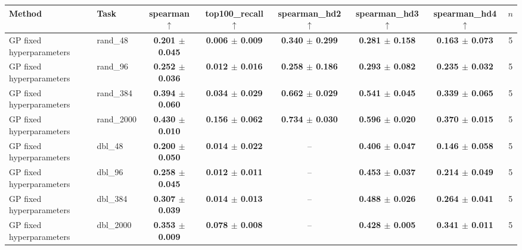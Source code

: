 \begin{tabular}{llcccccc}
\toprule
Method & Task & spearman $\uparrow$ & top100\_recall $\uparrow$ & spearman\_hd2 $\uparrow$ & spearman\_hd3 $\uparrow$ & spearman\_hd4 $\uparrow$ & $n$ \\
\midrule
GP fixed hyperparameters & rand\_48 & \textbf{0.201 $\pm$ 0.045} & \textbf{0.006 $\pm$ 0.009} & \textbf{0.340 $\pm$ 0.299} & \textbf{0.281 $\pm$ 0.158} & \textbf{0.163 $\pm$ 0.073} & 5 \\
\midrule
GP fixed hyperparameters & rand\_96 & \textbf{0.252 $\pm$ 0.036} & \textbf{0.012 $\pm$ 0.016} & \textbf{0.258 $\pm$ 0.186} & \textbf{0.293 $\pm$ 0.082} & \textbf{0.235 $\pm$ 0.032} & 5 \\
\midrule
GP fixed hyperparameters & rand\_384 & \textbf{0.394 $\pm$ 0.060} & \textbf{0.034 $\pm$ 0.029} & \textbf{0.662 $\pm$ 0.029} & \textbf{0.541 $\pm$ 0.045} & \textbf{0.339 $\pm$ 0.065} & 5 \\
\midrule
GP fixed hyperparameters & rand\_2000 & \textbf{0.430 $\pm$ 0.010} & \textbf{0.156 $\pm$ 0.062} & \textbf{0.734 $\pm$ 0.030} & \textbf{0.596 $\pm$ 0.020} & \textbf{0.370 $\pm$ 0.015} & 5 \\
\midrule
GP fixed hyperparameters & dbl\_48 & \textbf{0.200 $\pm$ 0.050} & \textbf{0.014 $\pm$ 0.022} & -- & \textbf{0.406 $\pm$ 0.047} & \textbf{0.146 $\pm$ 0.058} & 5 \\
\midrule
GP fixed hyperparameters & dbl\_96 & \textbf{0.258 $\pm$ 0.045} & \textbf{0.012 $\pm$ 0.011} & -- & \textbf{0.453 $\pm$ 0.037} & \textbf{0.214 $\pm$ 0.049} & 5 \\
\midrule
GP fixed hyperparameters & dbl\_384 & \textbf{0.307 $\pm$ 0.039} & \textbf{0.014 $\pm$ 0.013} & -- & \textbf{0.488 $\pm$ 0.026} & \textbf{0.264 $\pm$ 0.041} & 5 \\
\midrule
GP fixed hyperparameters & dbl\_2000 & \textbf{0.353 $\pm$ 0.009} & \textbf{0.078 $\pm$ 0.008} & -- & \textbf{0.428 $\pm$ 0.005} & \textbf{0.341 $\pm$ 0.011} & 5 \\
\bottomrule
\end{tabular}
